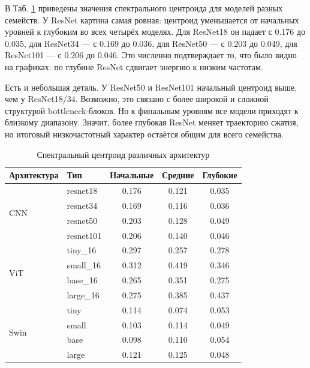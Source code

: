 В Таб. \ref{tab:SpectraCentr_metrics} приведены значения спектрального центроида для моделей разных семейств. У ResNet картина самая ровная: центроид уменьшается от начальных уровней к глубоким во всех четырёх моделях. Для ResNet18 он падает с 0.176 до 0.035, для ResNet34 — с 0.169 до 0.036, для ResNet50 — с 0.203 до 0.049, для ResNet101 — с 0.206 до 0.046. Это численно подтверждает то, что было видно на графиках: по глубине ResNet сдвигает энергию к низким частотам.

Есть и небольшая деталь. У ResNet50 и ResNet101 начальный центроид выше, чем у ResNet18/34. Возможно, это связано с более широкой и сложной структурой bottleneck-блоков. Но к финальным уровням все модели приходят к близкому диапазону. Значит, более глубокая ResNet меняет траекторию сжатия, но итоговый низкочастотный характер остаётся общим для всего семейства.

\begin{table}[h]
\centering
\caption{Спектральный центроид различных архитектур} 
\label{tab:SpectraCentr_metrics}
\vspace{1ex} 
\begin{tabular}{llccc} %
\toprule
\textbf{Архитектура} & \textbf{Тип} & \textbf{Начальные} & \textbf{Средние} & \textbf{Глубокие} \\
\midrule

\multirow{4}{*}{CNN} & resnet18      & 0.176 & 0.121 & 0.035 \\
                     & resnet34      & 0.169 & 0.116 & 0.036 \\
                     & resnet50      & 0.203 & 0.128 & 0.049 \\
                     & resnet101     & 0.206 & 0.140 & 0.046 \\

\midrule

\multirow{4}{*}{ViT} & tiny\_16      & 0.297 & 0.257 & 0.278 \\
                     & small\_16     & 0.312 & 0.419 & 0.346 \\
                     & base\_16      & 0.265 & 0.351 & 0.275 \\
                     & large\_16     & 0.275 & 0.385 & 0.437 \\
\midrule

\multirow{4}{*}{Swin} & tiny       & 0.114 & 0.074 & 0.053 \\
                      & small      & 0.103 & 0.114 & 0.049 \\
                      & base       & 0.098 & 0.110 & 0.054 \\
                      & large      & 0.121 & 0.125 & 0.048 \\
\bottomrule
\end{tabular}
\end{table}


